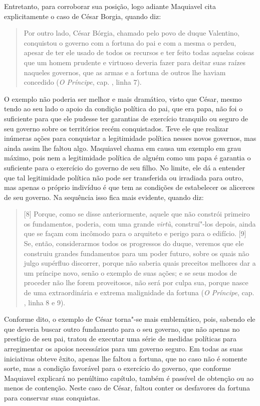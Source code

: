 Entretanto, para corroborar sua posição, logo adiante Maquiavel cita
explicitamente o caso de César Borgia, quando diz:

\begin{quote}
Por outro lado, César Bórgia, chamado pelo povo de duque Valentino,
conquistou o governo com a fortuna do pai e com a
mesma o perdeu, apesar de ter ele usado de todos os recursos e ter feito
todas aquelas coisas que um homem prudente e virtuoso deveria fazer para
deitar suas raízes naqueles governos, que as armas e a fortuna de outros
lhe haviam concedido (\emph{O Príncipe}, cap. , linha 7).
\end{quote}

O exemplo não poderia ser melhor e mais dramático, visto que César,
mesmo tendo ao seu lado o apoio da condição política do pai, que era
papa, não foi o suficiente para que ele pudesse ter garantias de
exercício tranquilo ou seguro de seu governo sobre os territórios recém
conquistados. Teve ele que realizar inúmeras ações para conquistar a
legitimidade política nesses novos governos, mas ainda assim lhe faltou
algo. Maquiavel chama em causa um exemplo em grau máximo, pois nem a
legitimidade política de alguém como um papa é garantia o suficiente
para o exercício do governo de seu filho. No limite, ele dá a entender
que tal legitimidade política não pode ser transferida ou irradiada para
outro, mas apenas o próprio indivíduo é que tem as condições de
estabelecer os alicerces de seu governo. Na sequência isso fica mais
evidente, quando diz:

\begin{quote}
{[}8{]} Porque, como se disse anteriormente, aquele que não
constrói primeiro os fundamentos, poderia, com uma grande \emph{virtù},
construí"-los depois, ainda que se façam com incômodo para o arquiteto e
perigo para o edifício. {[}9{]} Se, então, considerarmos todos os
progressos do duque, veremos que ele construiu grandes fundamentos para
um poder futuro, sobre os quais não julgo supérfluo discorrer, porque
não saberia quais preceitos melhores dar a um príncipe novo, senão o
exemplo de suas ações; e se seus modos de proceder não lhe forem
proveitosos, não será por culpa sua, porque nasce de uma extraordinária
e extrema malignidade da fortuna (\emph{O Príncipe}, cap. , linha 8 e
9).
\end{quote}

Conforme dito, o exemplo de César torna"-se mais emblemático, pois,
sabendo ele que deveria buscar outro fundamento para o seu governo, que
não apenas no prestígio de seu pai, tratou de executar uma série de
medidas políticas para arregimentar os apoios necessários para um
governo seguro. Em todas as suas iniciativas obteve êxito, apenas lhe
faltou a fortuna, que no caso não é somente sorte, mas a condição
favorável para o exercício do governo, que conforme Maquiavel explicará
no penúltimo capítulo, também é passível de obtenção ou ao menos de
contenção. Neste caso de César, faltou conter os desfavores da fortuna
para conservar suas conquistas.


